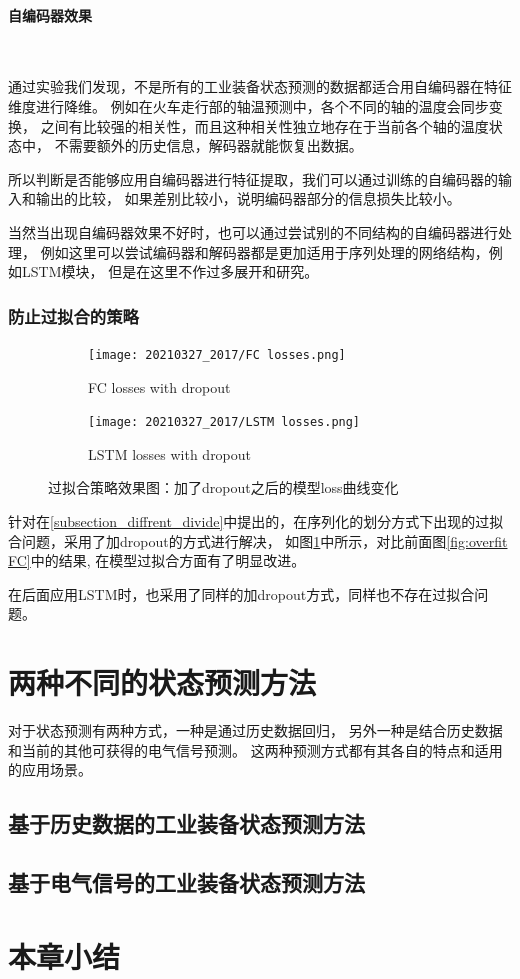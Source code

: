 \paragraph{自编码器效果}~{}

通过实验我们发现，不是所有的工业装备状态预测的数据都适合用自编码器在特征维度进行降维。
例如在火车走行部的轴温预测中，各个不同的轴的温度会同步变换，
之间有比较强的相关性，而且这种相关性独立地存在于当前各个轴的温度状态中，
不需要额外的历史信息，解码器就能恢复出数据。

所以判断是否能够应用自编码器进行特征提取，我们可以通过训练的自编码器的输入和输出的比较，
如果差别比较小，说明编码器部分的信息损失比较小。

当然当出现自编码器效果不好时，也可以通过尝试别的不同结构的自编码器进行处理，
例如这里可以尝试编码器和解码器都是更加适用于序列处理的网络结构，例如LSTM模块，
但是在这里不作过多展开和研究。

\subsubsection{防止过拟合的策略}

  \begin{figure}
    \centering
    \begin{subfigure}[b]{0.45\textwidth}
      \centering
      \texttt{[image: 20210327\_2017/FC losses.png]}
      \caption{FC losses with dropout}
      \label{fig:FC losses with dropout}
    \end{subfigure}
    \hfill
    \begin{subfigure}[b]{0.45\textwidth}
        \centering
        \texttt{[image: 20210327\_2017/LSTM losses.png]}
        \caption{LSTM losses with dropout}
        \label{fig:LSTM losses with dropout}
    \end{subfigure}
       \caption{过拟合策略效果图：加了dropout之后的模型loss曲线变化}
       \label{fig:losses with dropout}
  \end{figure}

  针对在\ref{subsection_diffrent_divide}中提出的，在序列化的划分方式下出现的过拟合问题，采用了加dropout的方式进行解决，
  如图\ref{fig:FC losses with dropout}中所示，对比前面图\ref{fig:overfit FC}中的结果,
  在模型过拟合方面有了明显改进。
  
  在后面应用LSTM时，也采用了同样的加dropout方式，同样也不存在过拟合问题。
\section{两种不同的状态预测方法}
对于状态预测有两种方式，一种是通过历史数据回归，
另外一种是结合历史数据和当前的其他可获得的电气信号预测。
这两种预测方式都有其各自的特点和适用的应用场景。
\subsection{基于历史数据的工业装备状态预测方法}
\subsection{基于电气信号的工业装备状态预测方法}


\section{本章小结}